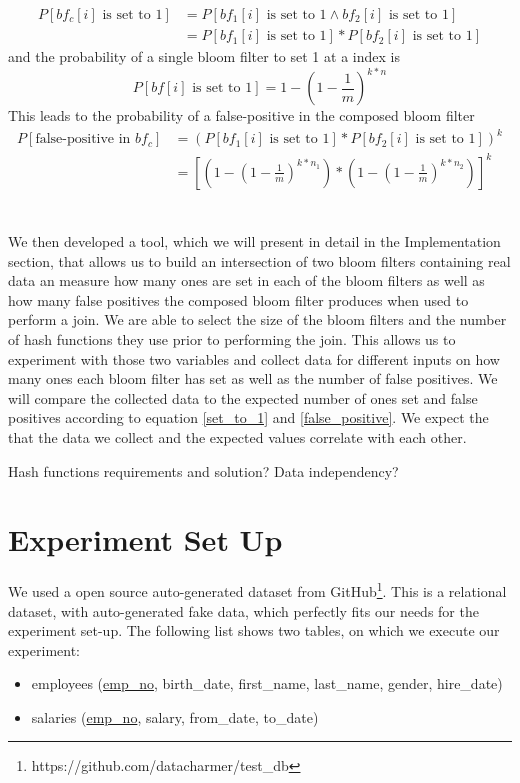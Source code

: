 \documentclass[12]{scrartcl}
\begin{document}
\begin{equation}
\begin{split}
	P[bf_c[i] \text{ is set to 1}] &= P[bf_1[i] \text{ is set to 1} \wedge bf_2[i] \text{ is set to 1}]\\
	&= P[bf_1[i] \text{ is set to 1}] * P[bf_2[i] \text{ is set to 1}]
\end{split}
\end{equation}
and the probability of a single bloom filter to set 1 at a index is
\begin{equation}
\label{set_to_1}
P[bf[i] \text{ is set to 1}] = 1-(1-\frac{1}{m})^{k*n}
\end{equation}
This leads to the probability of a false-positive in the composed bloom filter
\begin{equation}
\label{false_positive}
\begin{split}
P[\text{false-positive in }bf_c] &= (P[bf_1[i] \text{ is set to 1}] * P[bf_2[i] \text{ is set to 1}])^k\\
&= [(1-(1-\frac{1}{m})^{k*n_1}) * (1-(1-\frac{1}{m})^{k*n_2})]^k
\end{split}
\end{equation}\\\\
We then developed a tool, which we will present in detail in the Implementation section, that allows us to build an intersection of two bloom filters containing real data an measure how many ones are set in each of the bloom filters as well as how many false positives the composed bloom filter produces when used to perform a join. We are able to select the size of the bloom filters and the number of hash functions they use prior to performing the join. This allows us to experiment with those two variables and collect data for different inputs on how many ones each bloom filter has set as well as the number of false positives. We will compare the collected data to the expected number of ones set and false positives according to equation \ref{set_to_1} and \ref{false_positive}. We expect the that the data we collect and the expected values correlate with each other.
 
 Hash functions requirements and solution?
 Data independency?

\section{Experiment Set Up}
We used a open source auto-generated dataset from GitHub\footnote{https://github.com/datacharmer/test\_db}. This is a relational dataset, with auto-generated fake data, which perfectly fits our needs for the experiment set-up. The following list shows two tables, on which we execute our experiment: 
\begin{itemize}
	\item employees (\uline{emp\_no}, birth\_date, first\_name, last\_name, gender, hire\_date)
	\item salaries (\uline{emp\_no}, salary, from\_date, to\_date)
\end{itemize}
\end{document}
